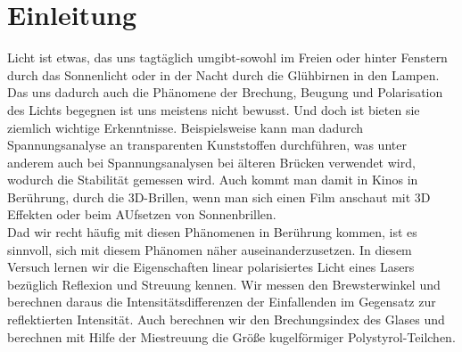 

\chapter{Einleitung}
\label{chap:einleitung}
Licht ist etwas, das uns tagtäglich umgibt-sowohl im Freien oder hinter Fenstern durch das Sonnenlicht oder in der Nacht durch die Glühbirnen in den Lampen. Das uns dadurch auch die Phänomene der Brechung, Beugung und Polarisation des Lichts begegnen ist uns meistens nicht bewusst. Und doch ist bieten sie  ziemlich wichtige Erkenntnisse. Beispielsweise kann man dadurch Spannungsanalyse an transparenten Kunststoffen durchführen, was unter anderem auch bei Spannungsanalysen bei älteren Brücken verwendet wird, wodurch die Stabilität gemessen wird. Auch kommt man damit in Kinos in Berührung, durch die 3D-Brillen, wenn man sich einen Film anschaut mit 3D Effekten oder beim AUfsetzen von Sonnenbrillen. \\
Dad wir recht häufig mit diesen Phänomenen in Berührung kommen, ist es sinnvoll, sich mit diesem Phänomen näher auseinanderzusetzen. In diesem Versuch lernen wir die Eigenschaften linear polarisiertes Licht eines Lasers bezüglich Reflexion und Streuung kennen. Wir messen den Brewsterwinkel und berechnen daraus die Intensitätsdifferenzen der Einfallenden im Gegensatz zur reflektierten Intensität. Auch berechnen wir den Brechungsindex des Glases und berechnen mit Hilfe der Miestreuung die Größe kugelförmiger Polystyrol-Teilchen. 
